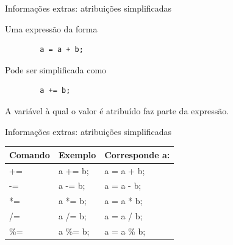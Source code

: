 \documentclass[handout]{beamer}
\begin{document}
\begin{frame}[fragile]{Informações extras: atribuições simplificadas}

    Uma expressão da forma

    \begin{verbatim}
        a = a + b;
    \end{verbatim}

    Pode ser simplificada como

    \begin{verbatim}
        a += b;
    \end{verbatim}

    A variável à qual o valor é atribuído faz parte da expressão.
\end{frame}


\begin{frame}[fragile]{Informações extras: atribuições simplificadas}

    \begin{center}
    \begin{tabular}{lll}
        \hline
        \textbf{Comando} & \textbf{Exemplo} & \textbf{Corresponde a:} \\
        \hline
        += & a += b; & a = a + b;  \\
        -= & a -= b; & a = a - b; \\
        *= & a *= b; & a = a * b; \\
        /= & a /= b; & a = a / b; \\
        \%= & a \%= b; & a = a \% b; \\
        \hline
    \end{tabular}
    \end{center}

\end{frame}

\end{document}
